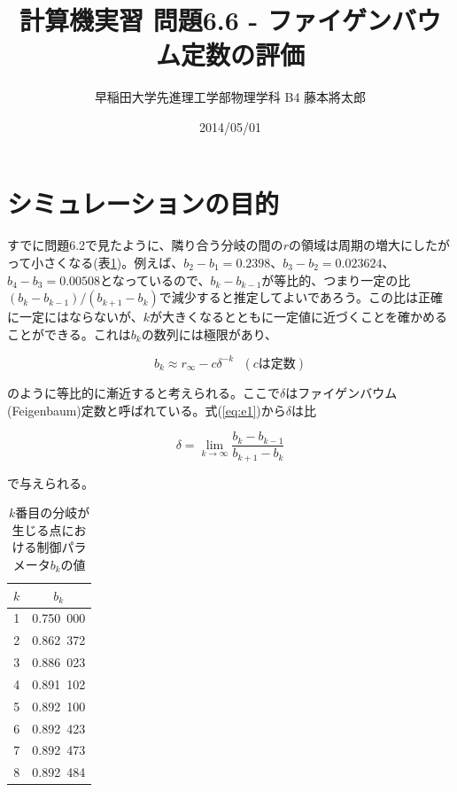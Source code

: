 \documentclass{jsarticle}
\title{計算機実習 問題6.6 - ファイゲンバウム定数の評価}
\author{早稲田大学先進理工学部物理学科 B4 藤本將太郎}
\date{2014/05/01}
\begin{document}
\maketitle

\section{シミュレーションの目的}
すでに問題6.2で見たように、隣り合う分岐の間の$r$の領域は周期の増大にしたがって小さくなる(表\ref{tab:t1})。例えば、$b_{2}-b_{1}=0.2398$、$b_{3}-b_{2}=0.023624$、$b_{4}-b_{3}=0.00508$となっているので、$b_{k}-b_{k-1}$が等比的、つまり一定の比$(b_{k}-b_{k-1})/(b_{k+1}-b_{k})$で減少すると推定してよいであろう。この比は正確に一定にはならないが、$k$が大きくなるとともに一定値に近づくことを確かめることができる。これは$b_{k}$の数列には極限があり、

\begin{equation}
  b_{k} \approx r_{\infty} -c \delta ^{-k}\ \ \ (cは定数)
  \label{eq:e1}
\end{equation}

のように等比的に漸近すると考えられる。ここで$\delta$はファイゲンバウム(Feigenbaum)定数と呼ばれている。式(\ref{eq:e1})から$\delta$は比

\begin{equation}
 \delta = \lim_{k \rightarrow \infty} \displaystyle\frac{b_{k}-b_{k-1}}{b_{k+1}-b_{k}}
\end{equation}

で与えられる。

\begin{table}[htbp]
\begin{center}
  \caption{$k$番目の分岐が生じる点における制御パラメータ$b_{k}$の値}
  \begin{tabular}{cc}
  $k$ & $b_{k}$  \\ \hline
  1 & 0.750\ 000 \\
  2 & 0.862\ 372 \\
  3 & 0.886\ 023 \\
  4 & 0.891\ 102 \\
  5 & 0.892\ 100 \\
  6 & 0.892\ 423 \\
  7 & 0.892\ 473 \\
  8 & 0.892\ 484 \\
  \hline
  \end{tabular}
  \label{tab:t1}
\end{center}
\end{table}
\end{document}
